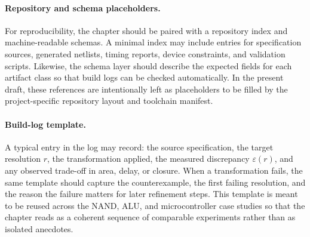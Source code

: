 \paragraph{Repository and schema placeholders.}
For reproducibility, the chapter should be paired with a repository index and machine-readable schemas. A minimal index may include entries for specification sources, generated netlists, timing reports, device constraints, and validation scripts. Likewise, the schema layer should describe the expected fields for each artifact class so that build logs can be checked automatically. In the present draft, these references are intentionally left as placeholders to be filled by the project-specific repository layout and toolchain manifest.

\paragraph{Build-log template.}
A typical entry in the log may record: the source specification, the target resolution \(r\), the transformation applied, the measured discrepancy \(\varepsilon(r)\), and any observed trade-off in area, delay, or closure. When a transformation fails, the same template should capture the counterexample, the first failing resolution, and the reason the failure matters for later refinement steps. This template is meant to be reused across the NAND, ALU, and microcontroller case studies so that the chapter reads as a coherent sequence of comparable experiments rather than as isolated anecdotes.

